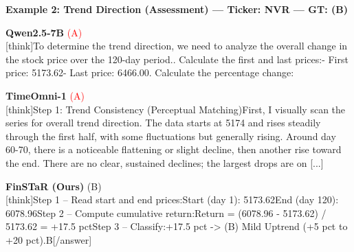 \noindent
\textbf{Example 2: Trend Direction (Assessment) --- Ticker: NVR --- GT: (B)}
\vspace{2pt}

\noindent
\begin{minipage}[t]{0.28\textwidth}
\colorbox{red!8}{\parbox{\dimexpr\textwidth-2\fboxsep}{
\textbf{Qwen2.5-7B} \textcolor{red}{(A)} \\[2pt]
\tiny
[think]\newline To determine the trend direction, we need to analyze the overall change in the stock price over the 120-day period.. Calculate the first and last prices:\newline    - First price: 5173.62\newline    - Last price: 6466.00. Calculate the percentage change:\newline    [\newline    (Percentage Change) = ((Last Price) - (First Price))((First Price))  100\newline    ]\newline    [\newline    (Percentage Change) = (6466.00 - 5173.62)(5173.62)  100 [...]
}}
\end{minipage}
\hfill
\begin{minipage}[t]{0.28\textwidth}
\colorbox{red!8}{\parbox{\dimexpr\textwidth-2\fboxsep}{
\textbf{TimeOmni-1} \textcolor{red}{(A)} \\[2pt]
\tiny
[think]\newline Step 1: Trend Consistency (Perceptual Matching)\newline First, I visually scan the series for overall trend direction. The data starts at  5174 and rises steadily through the first half, with some fluctuations but generally rising. Around day 60-70, there is a noticeable flattening or slight decline, then another rise toward the end. There are no clear, sustained declines; the largest drops are on [...]
}}
\end{minipage}
\hfill
\begin{minipage}[t]{0.41\textwidth}
\colorbox{green!10}{\parbox{\dimexpr\textwidth-2\fboxsep}{
\textbf{FinSTaR (Ours)} \textcolor{green!50!black}{(B)} \\[2pt]
\tiny
[think]\newline Step 1 -- Read start and end prices:\newline Start (day 1): 5173.62\newline End (day 120): 6078.96\newline Step 2 -- Compute cumulative return:\newline Return = (6078.96 - 5173.62) / 5173.62 = +17.5 pct\newline Step 3 -- Classify:\newline +17.5 pct -> (B) Mild Uptrend (+5 pct to +20 pct).\newline [/think]\newline [answer]B[/answer]
}}
\end{minipage}
\vspace{8pt}


